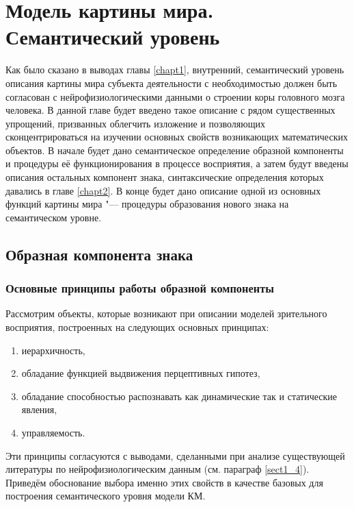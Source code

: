 \chapter{Модель картины мира. Семантический уровень} \label{chapt3}

Как было сказано в выводах главы \ref{chapt1}, внутренний, семантический уровень описания картины мира субъекта деятельности с необходимостью должен быть согласован с нейрофизиологическими данными о строении коры головного мозга человека. В данной главе будет введено такое описание с рядом существенных упрощений, призванных облегчить изложение и позволяющих сконцентрироваться на изучении основных свойств возникающих математических объектов. В начале будет дано семантическое определение образной компоненты и процедуры её функционирования в процессе восприятия, а затем будут введены описания остальных компонент знака, синтаксические определения которых давались в главе \ref{chapt2}. В конце будет дано описание одной из основных функций картины мира "--- процедуры образования нового знака на семантическом уровне.

\section{Образная компонента знака}\label{sect3_1}

\subsection{Основные принципы работы образной компоненты} \label{subsect3_1_1}

Рассмотрим объекты, которые возникают при описании моделей зрительного восприятия, построенных на следующих основных принципах:
\begin{enumerate}
	\item иерархичность,
	\item обладание функцией выдвижения перцептивных гипотез,
	\item обладание способностью распознавать как динамические так и статические явления,
	\item управляемость.
\end{enumerate}

Эти принципы согласуются с выводами, сделанными при анализе существующей литературы по нейрофизиологическим данным (см. параграф \ref{sect1_4}). Приведём обоснование выбора именно этих свойств в качестве базовых для построения семантического уровня модели КМ.


